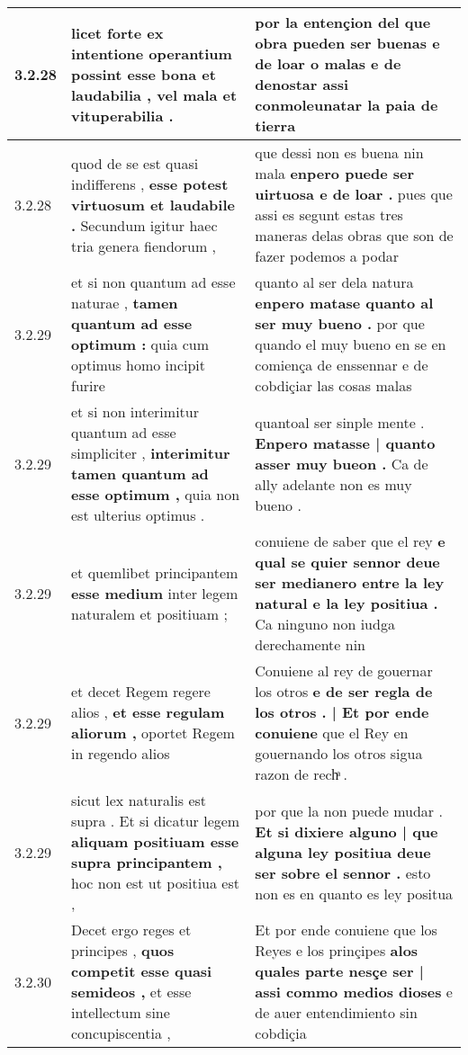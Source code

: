 \begin{tabular}{|p{1cm}|p{6.5cm}|p{6.5cm}|}
3.2.28 & licet forte ex intentione operantium possint \textbf{ esse bona et laudabilia , } vel mala et vituperabilia . & por la entençion \textbf{ del que obra pueden ser buenas e de loar o malas e de denostar assi } conmoleunatar la paia de tierra \\\hline
3.2.28 & quod de se est quasi indifferens , \textbf{ esse potest virtuosum et laudabile . } Secundum igitur haec tria genera fiendorum , & que dessi non es buena nin mala \textbf{ enpero puede ser uirtuosa e de loar . } pues que assi es segunt estas tres maneras delas obras que son de fazer podemos a podar \\\hline
3.2.29 & et si non quantum ad esse naturae , \textbf{ tamen quantum ad esse optimum : } quia cum optimus homo incipit furire & quanto al ser dela natura \textbf{ enpero matase quanto al ser muy bueno . } por que quando el muy bueno en se en comiença de enssennar e de cobdiçiar las cosas malas \\\hline
3.2.29 & et si non interimitur quantum ad esse simpliciter , \textbf{ interimitur tamen quantum ad esse optimum , } quia non est ulterius optimus . & quantoal ser sinple mente . \textbf{ Enpero matasse | quanto asser muy bueon . } Ca de ally adelante non es muy bueno . \\\hline
3.2.29 & et quemlibet principantem \textbf{ esse medium } inter legem naturalem et positiuam ; & conuiene de saber que el rey \textbf{ e qual se quier sennor deue ser medianero entre la ley natural e la ley positiua . } Ca ninguno non iudga derechamente nin \\\hline
3.2.29 & et decet Regem regere alios , \textbf{ et esse regulam aliorum , } oportet Regem in regendo alios & Conuiene al rey de gouernar los otros \textbf{ e de ser regla de los otros . | Et por ende conuiene } que el Rey en gouernando los otros sigua razon de rechͣ . \\\hline
3.2.29 & sicut lex naturalis est supra . Et si dicatur legem \textbf{ aliquam positiuam esse supra principantem , } hoc non est ut positiua est , & por que la non puede mudar . \textbf{ Et si dixiere alguno | que alguna ley positiua deue ser sobre el sennor . } esto non es en quanto es ley positua \\\hline
3.2.30 & Decet ergo reges et principes , \textbf{ quos competit esse quasi semideos , } et esse intellectum sine concupiscentia , & Et por ende conuiene que los Reyes e los prinçipes \textbf{ alos quales parte nesçe ser | assi commo medios dioses } e de auer entendimiento sin cobdiçia \\\hline

\end{tabular}
